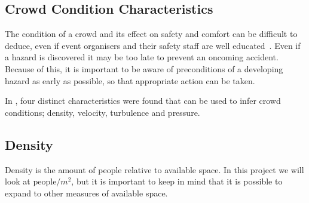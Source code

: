 




\subsection{Crowd Condition Characteristics}

The condition of a crowd and its effect on safety and comfort can be difficult to deduce, even if event organisers and their safety staff are well educated~\cite{franke2015smart}. Even if a hazard is discovered it may be too late to prevent an oncoming accident. Because of this, it is important to be aware of preconditions of a developing hazard as early as possible, so that appropriate action can be taken.

In \citet{wirz2012inferring}, four distinct characteristics were found that can be used to infer crowd conditions; density, velocity, turbulence and pressure.

\subsection{Density}
Density is the amount of people relative to available space. In this project we will look at $\text{people} / m^2$, but it is important to keep in mind that it is possible to expand to other measures of available space.

